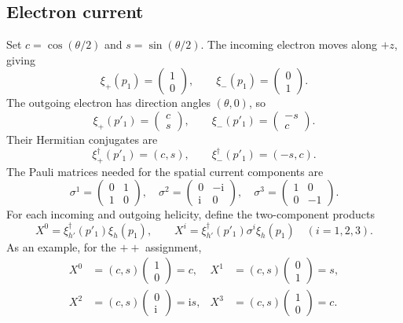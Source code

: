 \documentclass[12pt,a4paper]{article}
\numberwithin{equation}{section}
\newcommand{\ii}{\mathrm i}
\begin{document}
\subsection{Electron current}
Set $c=\cos(\theta/2)$ and $s=\sin(\theta/2)$. The incoming electron moves
along $+z$, giving
\begin{equation}
 \xi_+(p_1)=\begin{pmatrix}1\\0\end{pmatrix},\qquad
 \xi_-(p_1)=\begin{pmatrix}0\\1\end{pmatrix}.
\end{equation}
The outgoing electron has direction angles $(\theta,0)$, so
\begin{equation}
 \xi_+(p'_1)=\begin{pmatrix}c\\s\end{pmatrix},\qquad
 \xi_-(p'_1)=\begin{pmatrix}-s\\c\end{pmatrix}.
\end{equation}
Their Hermitian conjugates are
\begin{equation}
 \xi_+^\dagger(p'_1)=(c,s),\qquad
 \xi_-^\dagger(p'_1)=(-s,c).
\end{equation}
The Pauli matrices needed for the spatial current components are
\begin{equation}
 \sigma^1=\begin{pmatrix}0&1\\1&0\end{pmatrix},\quad
 \sigma^2=\begin{pmatrix}0&-\ii\\\ii&0\end{pmatrix},\quad
 \sigma^3=\begin{pmatrix}1&0\\0&-1\end{pmatrix}.
\end{equation}
For each incoming and outgoing helicity, define the two-component products
\begin{equation}
 X^0=\xi_{h'}^\dagger(p'_1)\xi_h(p_1),\qquad
 X^i=\xi_{h'}^\dagger(p'_1)\sigma^i\xi_h(p_1)\quad(i=1,2,3).
\end{equation}
As an example, for the $++$ assignment,
\begin{align}
 X^0&=(c,s)\begin{pmatrix}1\\0\end{pmatrix}=c,&
 X^1&=(c,s)\begin{pmatrix}0\\1\end{pmatrix}=s,\\
 X^2&=(c,s)\begin{pmatrix}0\\\ii\end{pmatrix}=\ii s,&
 X^3&=(c,s)\begin{pmatrix}1\\0\end{pmatrix}=c.
\end{align}
\end{document}

